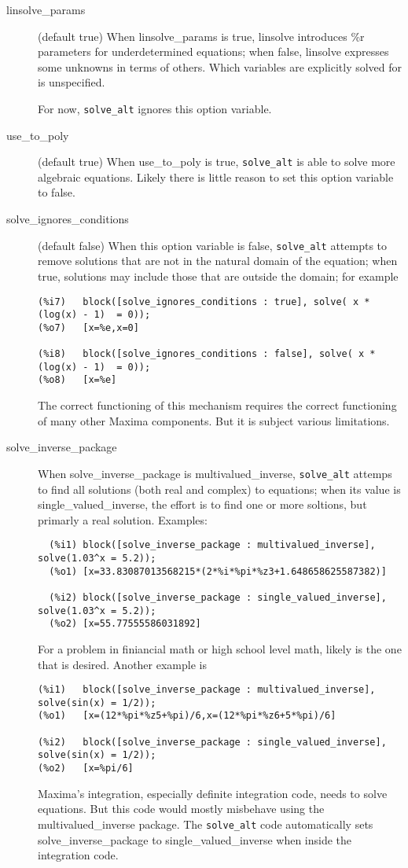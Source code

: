 \documentclass[]{scrartcl}
\newcommand{\altsolve}{\texttt{solve\_alt}}
\begin{document}
\begin{description}
\item [linsolve\_params] (default true) When linsolve\_params is true, linsolve introduces \%r parameters for underdetermined equations; when false, linsolve expresses some unknowns in terms of others. Which variables are explicitly solved for is unspecified.

For now, \altsolve \/ ignores this option variable.

\item [use\_to\_poly] (default true)  When use\_to\_poly is true, \altsolve\/ is able to solve more algebraic equations.  Likely there is little reason to set this option variable to false.

\item[solve\_ignores\_conditions] (default false) When this option variable is false, \altsolve\/ attempts to remove solutions that are not in the natural domain of the equation; when true, solutions may include those that are outside the domain; for example
\begin{verbatim}
(%i7)	block([solve_ignores_conditions : true], solve( x * (log(x) - 1)  = 0));
(%o7)	[x=%e,x=0]

(%i8)	block([solve_ignores_conditions : false], solve( x * (log(x) - 1)  = 0));
(%o8)	[x=%e]
\end{verbatim}

The correct functioning of this mechanism requires the correct functioning of many other Maxima components. But it is subject various limitations.

\item[solve\_inverse\_package] When solve\_inverse\_package is multivalued\_inverse, \altsolve\/ attemps to find all solutions (both real and complex) to equations; when its value is single\_valued\_inverse, the effort is to find one or more soltions, but primarly a real solution. Examples:
\begin{verbatim}
  (%i1)	block([solve_inverse_package : multivalued_inverse], solve(1.03^x = 5.2));
  (%o1)	[x=33.83087013568215*(2*%i*%pi*%z3+1.648658625587382)]

  (%i2)	block([solve_inverse_package : single_valued_inverse], solve(1.03^x = 5.2));
  (%o2)	[x=55.77555586031892]
\end{verbatim}
For a problem in finiancial math or high school level math, likely is the one that is desired. Another
example is
\begin{verbatim}
(%i1)	block([solve_inverse_package : multivalued_inverse], solve(sin(x) = 1/2));
(%o1)	[x=(12*%pi*%z5+%pi)/6,x=(12*%pi*%z6+5*%pi)/6]

(%i2)	block([solve_inverse_package : single_valued_inverse], solve(sin(x) = 1/2));
(%o2)	[x=%pi/6]
\end{verbatim}

Maxima's integration, especially definite integration code, needs to solve equations. But this code would mostly misbehave using the  multivalued\_inverse package. The \altsolve\/ code automatically sets solve\_inverse\_package to single\_valued\_inverse when inside the integration code.

\end{description}
\end{document}
